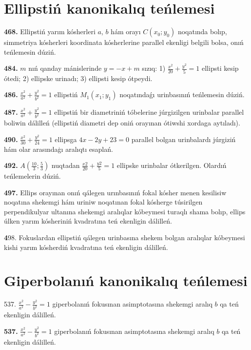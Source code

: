 \section{Ellipstiń kanonikalıq teńlemesi}


\textbf {468.} Ellipstiń yarım kósherleri $a$, $b$ hám orayı $C\left (x_0; y_0\right) $ noqatında bolıp, simmetriya kósherleri koordinata kósherlerine parallel ekenligi belgili bolsa, onıń teńlemesin dúziń.


\textbf {484.} $m$ nıń qanday mánislerinde $y=-x+m$ sızıq: 1) $\frac{x^2}{20}+\frac{y^2}{5}=1$ ellipsti kesip ótedi; 2) ellipske urinadı; 3) ellipsti kesip ótpeydi.


\textbf {486.} $\frac{x^2}{a^2}+\frac{y^2}{b^2}=1$ ellipstiń $M_1 (x_1; y_1) $ noqatındaǵı urinbasınıń teńlemesin dúziń.

\textbf{487.} $\frac{x^2}{a^2}+\frac{y^2}{b^2}=1$ ellipstiń bir diametriniń tóbelerine júrgizilgen urinbalar parallel boliwin dálilleń (ellipstiń diametri dep oniń orayınan ótiwshi xordaga aytıladı).

\textbf{490.} $\frac{x^2}{30}+\frac{y^2}{24}=1$ ellipsga $4x-2y+23=0$ parallel bolgan urinbalardı júrgiziń hám olar arasındaģı aralıqtı esaplań.

\textbf{492.} $A\left(\frac{10}{3}; \frac{5}{3}\right)$ nuqtadan $\frac{x2}{20}+\frac{y2}{5}=1$ ellipske urinbalar ótkerilgen. Olardıń teńlemelerin dúziń.

\textbf{497.} Ellips orayınan onıń qálegen urınbasınıń fokal kósher menen kesilisiw noqatına shekemgi hám uriniw noqatınan fokal kósherge túsirilgen perpendikulyar ultanına shekemgi aralıqlar kóbeymesi turaqlı shama bolıp, ellips úlken yarım kósheriniń kvadratına teń ekenligin dálilleń.

\textbf 498. Fokuslardan ellipstiń qálegen urinbasına shekem bolgan aralıqlar kóbeymesi kishi yarım kósherdiń kvadratına teń ekenligin dálilleń.



\section{Giperbolanıń kanonikalıq teńlemesi}





{537.} $\frac{x^2}{a^2}-\frac{y^2}{b^2}=1$ giperbolanıń fokusınan asimptotasına shekemgi aralıq $b$ qa teń ekenligin dálilleń.

\textbf{537.} $\frac{x^2}{a^2}-\frac{y^2}{b^2}=1$ giperbolanıń fokusınan asimptotasına shekemgi aralıq $b$ qa teń ekenligin dálilleń.


